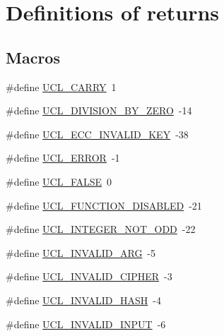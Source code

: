 \hypertarget{group___u_c_l___r_e_t_u_r_n}{}\section{Definitions of returns}
\label{group___u_c_l___r_e_t_u_r_n}
\subsection*{Macros}
\begin{DoxyCompactItemize}
\item 
\#define \hyperlink{group___u_c_l___r_e_t_u_r_n_ga0dce5f26cc3acf0bcca51853edc2b10f}{U\+C\+L\+\_\+\+C\+A\+R\+RY}~1
\item 
\#define \hyperlink{group___u_c_l___r_e_t_u_r_n_gafc7aaea99d505ed3f41233839c2cb931}{U\+C\+L\+\_\+\+D\+I\+V\+I\+S\+I\+O\+N\+\_\+\+B\+Y\+\_\+\+Z\+E\+RO}~-\/14
\item 
\#define \hyperlink{group___u_c_l___r_e_t_u_r_n_gae119e5730135c867480f836a9c784583}{U\+C\+L\+\_\+\+E\+C\+C\+\_\+\+I\+N\+V\+A\+L\+I\+D\+\_\+\+K\+EY}~-\/38
\item 
\#define \hyperlink{group___u_c_l___r_e_t_u_r_n_gafd05d0634dc32843163713aaed20563a}{U\+C\+L\+\_\+\+E\+R\+R\+OR}~-\/1
\item 
\#define \hyperlink{group___u_c_l___r_e_t_u_r_n_gad3a862f5f0e7cc34da71225a3438530e}{U\+C\+L\+\_\+\+F\+A\+L\+SE}~0
\item 
\#define \hyperlink{group___u_c_l___r_e_t_u_r_n_ga9027ff13a3693edb80f434637854b404}{U\+C\+L\+\_\+\+F\+U\+N\+C\+T\+I\+O\+N\+\_\+\+D\+I\+S\+A\+B\+L\+ED}~-\/21
\item 
\#define \hyperlink{group___u_c_l___r_e_t_u_r_n_ga363dbaa89915c7ec570e0746dd6db266}{U\+C\+L\+\_\+\+I\+N\+T\+E\+G\+E\+R\+\_\+\+N\+O\+T\+\_\+\+O\+DD}~-\/22
\item 
\#define \hyperlink{group___u_c_l___r_e_t_u_r_n_ga5e4b3a2e5cbcf09c2486f2e9d793a47b}{U\+C\+L\+\_\+\+I\+N\+V\+A\+L\+I\+D\+\_\+\+A\+RG}~-\/5
\item 
\#define \hyperlink{group___u_c_l___r_e_t_u_r_n_ga4b7d4436f37b1e54815006bde457cb63}{U\+C\+L\+\_\+\+I\+N\+V\+A\+L\+I\+D\+\_\+\+C\+I\+P\+H\+ER}~-\/3
\item 
\#define \hyperlink{group___u_c_l___r_e_t_u_r_n_ga6d7e5e9335ae078f64082b7f5b2ccb82}{U\+C\+L\+\_\+\+I\+N\+V\+A\+L\+I\+D\+\_\+\+H\+A\+SH}~-\/4
\item 
\#define \hyperlink{group___u_c_l___r_e_t_u_r_n_ga0ce984d38effddf33eb42be5ff3d87cf}{U\+C\+L\+\_\+\+I\+N\+V\+A\+L\+I\+D\+\_\+\+I\+N\+P\+UT}~-\/6

\end{DoxyCompactItemize}
